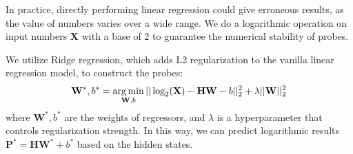 \documentclass[11pt]{article}
\begin{document}
In practice, directly performing linear regression could give erroneous results, as the value of numbers varies over a wide range.
We do a logarithmic operation on input numbers $\mathbf{X}$ with a base of 2 to guarantee the numerical stability of probes.

We utilize Ridge regression, which adds L2 regularization to the vanilla linear regression model, to construct the probes:
\begin{equation}
\small
    \mathbf{W}^*, b^* = \mathop{\arg\min}\limits_{\mathbf{W}, b} ||\log_{2}(\mathbf{X})-\mathbf{H}\mathbf{W}-b||^2_2 + \lambda ||\mathbf{W}||^2_2
\end{equation}
where $\mathbf{W}^*, b^*$ are the weights of regressors, and $\lambda$ is a hyperparameter that controls regularization strength.
In this way, we can predict logarithmic results $\mathbf{P}^* = \mathbf{H}\mathbf{W}^* + b^*$ based on the hidden states.
\end{document}
